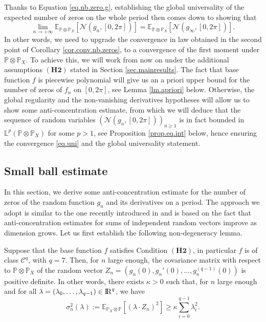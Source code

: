 \documentclass{svproc}
\newcommand{\Prob}{\mathbb{P}}
\newcommand \Esp {\mathbb{E}}
\def\R{{\rm I\kern-0.16em R}}
\begin{document}
\par \bigskip
Thanks to Equation \eqref{eq.nb.zero.g}, establishing the global universality of the expected number of zeros on the whole period  then comes down to showing that
\begin{equation}\label{eq.uni}
\lim_{n\to +\infty}\Esp_{\Prob \otimes \Prob_X} \left[\mathcal{N}(g_n,[0,2\pi])\right]=\Esp_{\Prob \otimes \Prob_X}\left[\mathcal{N}(g_{\infty},[0,2\pi])\right].
\end{equation}
In other words, we need to upgrade the convergence in law obtained in the second point of Corollary \ref{cor.conv.nb.zeros}, to a convergence of the first moment under $\mathbb P\otimes \mathbb P_X$. 
To achieve this, we will work from now on under the additional assumptions $\mathbf{(H2)}$ stated in Section \ref{sec.mainresults}.
The fact that base function $f$ is piecewise polynomial will give us an a priori upper bound for the number of zeros of $f_n$ on $[0,2\pi]$, see Lemma \ref{lm.apriori} below. Otherwise, the global regularity and the non-vanishing derivatives hypotheses will allow us to show some anti-concentration estimate, from which we will deduce that the sequence of random variables $(\mathcal{N}(g_n,[0,2\pi]))_{n \geq 1}$ is in fact bounded in $\mathbb L^p(\mathbb P \otimes \mathbb P_X)$ for some $p>1$, see Proposition \ref{prop.eq.int} below, hence ensuring the convergence \eqref{eq.uni} and the global universality statement. 


\subsection{Small ball estimate}
In this section, we derive some anti-concentration estimate for the number of zeros of the random function $g_n$ and its derivatives on a period. The approach we adopt is similar to the one recently introduced in \cite{AMP24} and is based on the fact that anti-concentration estimates for sums of independent random vectors improve as dimension grows. Let us first establish the following non-degeneracy lemma. 
\begin{lemma}\label{lem.nondeg}
Suppose that the base function $f$ satisfies Condition $(\mathbf{H2})$, in particular $f$ is of class $\mathcal C^{q}$, with $q=7$. Then, for $n$ large enough, the covariance matrix with respect to $\Prob \otimes \Prob_X$ of the random vector $Z_n=\left(g_n(0),g_n'(0),\dots, g_n^{(q-1)}(0)\right)$ is positive definite. In other words, there exists $\kappa>0$ such that, for $n$ large enough and for all $\lambda=(\lambda_0,\dots, \lambda_{q-1})\in \R^{q}$, we have
\[
\sigma_n^2(\lambda) :=\Esp_{\Prob_X\otimes \Prob}\left[\left(\lambda \cdot Z_n\right)^2\right] \geq \kappa \sum_{i=0}^{q-1} \lambda_i^2 .
\]
\end{lemma}
\end{document}
